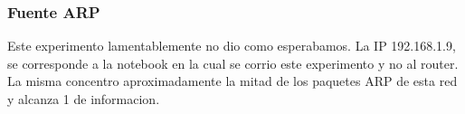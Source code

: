 \subsubsection{Fuente ARP}

\begin{figure}
	\begin{minipage}[b]{0.9\linewidth}
	\end{minipage}
\end{figure}

Este experimento lamentablemente no dio como esperabamos. La IP 192.168.1.9, se corresponde
a la notebook en la cual se corrio este experimento y no al router. La misma concentro aproximadamente
la mitad de los paquetes ARP de esta red y alcanza 1 de informacion.

